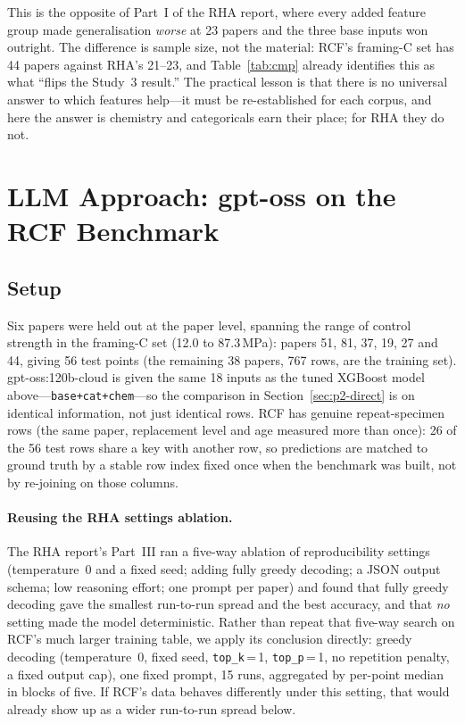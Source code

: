 \documentclass[11pt]{article}
\begin{document}
This is the opposite of Part~I of the RHA report, where every added feature group made
generalisation \emph{worse} at 23 papers and the three base inputs won outright. The
difference is sample size, not the material: RCF's framing-C set has 44 papers against
RHA's 21--23, and Table~\ref{tab:cmp} already identifies this as what ``flips the
Study~3 result.'' The practical lesson is that there is no universal answer to which
features help---it must be re-established for each corpus, and here the answer is
chemistry and categoricals earn their place; for RHA they do not.

\section{LLM Approach: gpt-oss on the RCF Benchmark}
\label{sec:p2-llm}

\subsection{Setup}
Six papers were held out at the paper level, spanning the range of control strength in
the framing-C set (12.0 to 87.3\,MPa): papers 51, 81, 37, 19, 27 and 44, giving 56 test
points (the remaining 38 papers, 767 rows, are the training set). gpt-oss:120b-cloud is
given the same 18 inputs as the tuned XGBoost model above---\texttt{base+cat+chem}---so
the comparison in Section~\ref{sec:p2-direct} is on identical information, not just
identical rows. RCF has genuine repeat-specimen rows (the same paper, replacement level
and age measured more than once): 26 of the 56 test rows share a key with another row,
so predictions are matched to ground truth by a stable row index fixed once when the
benchmark was built, not by re-joining on those columns.

\paragraph{Reusing the RHA settings ablation.} The RHA report's Part~III ran a five-way
ablation of reproducibility settings (temperature~0 and a fixed seed; adding fully
greedy decoding; a JSON output schema; low reasoning effort; one prompt per paper) and
found that fully greedy decoding gave the smallest run-to-run spread and the best
accuracy, and that \emph{no} setting made the model deterministic. Rather than repeat
that five-way search on RCF's much larger training table, we apply its conclusion
directly: greedy decoding (temperature~0, fixed seed, \texttt{top\_k}\,=\,1,
\texttt{top\_p}\,=\,1, no repetition penalty, a fixed output cap), one fixed prompt, 15
runs, aggregated by per-point median in blocks of five. If RCF's data behaves
differently under this setting, that would already show up as a wider run-to-run spread
below.
\end{document}
